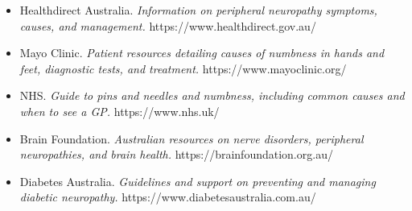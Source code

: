 \begin{itemize}
    \item Healthdirect Australia. \textit{Information on peripheral neuropathy symptoms, causes, and management.} https://www.healthdirect.gov.au/
    \item Mayo Clinic. \textit{Patient resources detailing causes of numbness in hands and feet, diagnostic tests, and treatment.} https://www.mayoclinic.org/
    \item NHS. \textit{Guide to pins and needles and numbness, including common causes and when to see a GP.} https://www.nhs.uk/
    \item Brain Foundation. \textit{Australian resources on nerve disorders, peripheral neuropathies, and brain health.} https://brainfoundation.org.au/
    \item Diabetes Australia. \textit{Guidelines and support on preventing and managing diabetic neuropathy.} https://www.diabetesaustralia.com.au/
\end{itemize}
